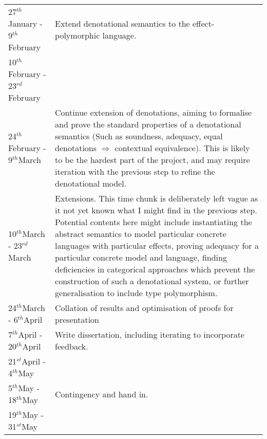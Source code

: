 \documentclass[11pt]{article}
\newcommand{\st}{$^{st}$}
\renewcommand{\th}{$^{th}$}
\newcommand{\rd}{$^{rd}$}
\begin{document}
\begin{tabular}{|p{6cm}||p{10cm}|}
	27\th January - 9\th February &  Extend denotational semantics to the effect-polymorphic language.
	\\\cline{1-1}
	10\th February - 23\rd February &  \\\hline
	24\th February - 9\th March & Continue extension of denotations, aiming to formalise and prove the standard properties of a denotational semantics (Such as soundness, adequacy, equal denotations $\Rightarrow$ contextual equivalence). This is likely to be the hardest part of the project, and may require iteration with the previous step to refine the denotational model. \\\hline
	10\th March - 23\rd March & Extensions. This time chunk is deliberately left vague as it not yet known what I might find in the previous step. Potential contents here might include instantiating the abstract semantics to model particular concrete languages with particular effects, proving adequacy for a particular concrete model and language, finding deficiencies in categorical approaches which prevent the construction of such a denotational system, or further generalisation to include type polymorphism. \\\hline
	24\th March - 6\th April & Collation of results and optimisation of proofs for presentation \\\hline
	7\th April - 20\th April & Write dissertation, including iterating to incorporate feedback. \\\cline{1-1}
	21\st April - 4\th May &\\\hline
	5\th May - 18\th May & Contingency and hand in.\\\cline{1-1}
	19\th May - 31\st May & \\
\hline
\end{tabular}

\newpage
\appendix
\end{document}
